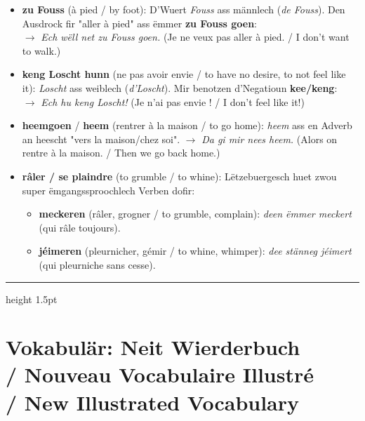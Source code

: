 \begin{itemize}
    \item \textbf{zu Fouss} (à pied / by foot):
    D'Wuert \textit{Fouss} ass männlech (\textit{de Fouss}). Den Ausdrock fir "aller à pied" ass ëmmer \textbf{zu Fouss goen}: \\
    $\rightarrow$ \textit{Ech wëll net zu Fouss goen.} (Je ne veux pas aller à pied. / I don't want to walk.)
    
    \item \textbf{keng Loscht hunn} (ne pas avoir envie / to have no desire, to not feel like it):
    \textit{Loscht} ass weiblech (\textit{d'Loscht}). Mir benotzen d'Negatioun \textbf{kee/keng}: \\
    $\rightarrow$ \textit{Ech hu keng Loscht!} (Je n'ai pas envie ! / I don't feel like it!)
    
    \item \textbf{heemgoen} / \textbf{heem} (rentrer à la maison / to go home):
    \textit{heem} ass en Adverb an heescht "vers la maison/chez soi".
    $\rightarrow$ \textit{Da gi mir nees heem.} (Alors on rentre à la maison. / Then we go back home.)
    
    \item \textbf{râler / se plaindre} (to grumble / to whine):
    Lëtzebuergesch huet zwou super ëmgangssproochlech Verben dofir:
    \begin{itemize}
        \item \textbf{meckeren} (râler, grogner / to grumble, complain): \textit{deen ëmmer meckert} (qui râle toujours).
        \item \textbf{jéimeren} (pleurnicher, gémir / to whine, whimper): \textit{dee stänneg jéimert} (qui pleurniche sans cesse).
    \end{itemize}
\end{itemize}

\vspace{1.5cm}
\color{geminiBlue}\hrule height 1.5pt \vspace{0.5em}\color{black}

\section[Vokabulär: Neit Wierderbuch]{Vokabulär: Neit Wierderbuch \\/ Nouveau Vocabulaire Illustré \\/ New Illustrated Vocabulary}

